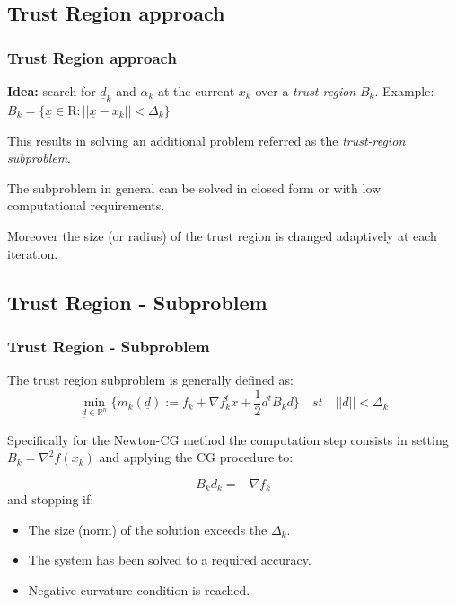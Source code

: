 \documentclass[professionalfont]{beamer}
\begin{document}
  \subsection{Trust Region approach}
  \begin{frame}
    \frametitle{Trust Region approach}
    \textbf{Idea:} search for $\underline{d}_k$ and $\alpha_k$ at the current $x_k$ over a
    \textit{trust region} $B_k$.\newline
    Example: $B_k = \{\underline{x} \in \mathrm{R} : ||\underline{x} - x_k|| < \Delta_k\}$\newline

    This results in solving an additional problem referred as the \textit{trust-region subproblem}.\newline

    The subproblem in general can be solved in closed form or with low computational requirements.

    Moreover the size (or radius) of the trust region is changed adaptively at each iteration.
  \end{frame}

  \subsection{Trust Region - Subproblem}
  \begin{frame}
    \frametitle{Trust Region - Subproblem}
    The trust region subproblem is generally defined as:
    \begin{equation}
      \min_{\underline{d} \in \mathbb{R}^n} \{m_k(\underline{d}) := f_k + \nabla f_k^{t} x + \frac{1}{2} d^{t} B_k d \} \quad st \quad ||d|| < \Delta_k
      \label{subproblem}
    \end{equation}

    Specifically for the Newton-CG method the computation step consists in setting $B_k = \nabla^2 f(x_k)$ and
    applying the CG procedure to:

    \begin{equation*}
      B_k d_k = - \nabla f_k
    \end{equation*}
    and stopping if:
    \begin{itemize}
      \item The size (norm) of the solution exceeds the $\Delta_k$.
      \item The system has been solved to a required accuracy.
      \item Negative curvature condition is reached.
    \end{itemize}
  \end{frame}
\end{document}
